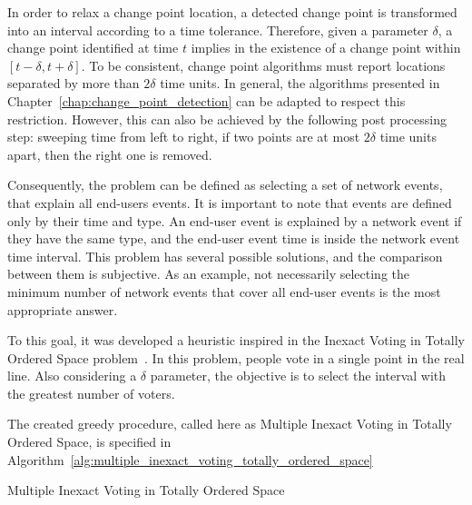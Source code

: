 In order to relax a change point location, a detected change point is
transformed into an interval according to a time tolerance.
Therefore, given a parameter $\delta$, a change point identified at
time $t$ implies in the existence of a change point within
$[t - \delta, t + \delta]$. To be consistent,
change point algorithms must report locations separated by more than
$2 \delta$ time units. In general, the algorithms presented in
Chapter~\ref{chap:change_point_detection}
can be adapted to respect this restriction. However, this can also be
achieved by the following post processing step:
sweeping time from left to right, if two
points are at most $2 \delta$ time units apart, then the right one is removed.

Consequently, the problem can be defined as selecting a set of network events,
that explain all end-users events. It is important to note that events are
defined only by their time and type.
An end-user event is explained by a network event if they have the same type,
and the end-user event time is inside the network event time interval.
This problem has several possible solutions, and the comparison between
them is subjective. As an example, not
necessarily selecting the minimum number of network events that cover all
end-user events is the most appropriate answer.

To this goal, it was developed a heuristic inspired in the Inexact Voting in
Totally
Ordered Space problem~\cite{voting_algorithms}. In this problem, people
vote in a single point in the real line. Also considering a $\delta$
parameter, the objective is to
select the interval with the greatest number of voters.

The created greedy procedure, called here as Multiple Inexact Voting in Totally
Ordered Space, is specified in
Algorithm~\ref{alg:multiple_inexact_voting_totally_ordered_space}

\begin{algorithm}[H]
\caption{Multiple Inexact Voting in Totally Ordered Space}
\label{alg:multiple_inexact_voting_totally_ordered_space}
    \begin{algorithmic}[1]
        \EndWhile{}
    \end{algorithmic}
\end{algorithm}


